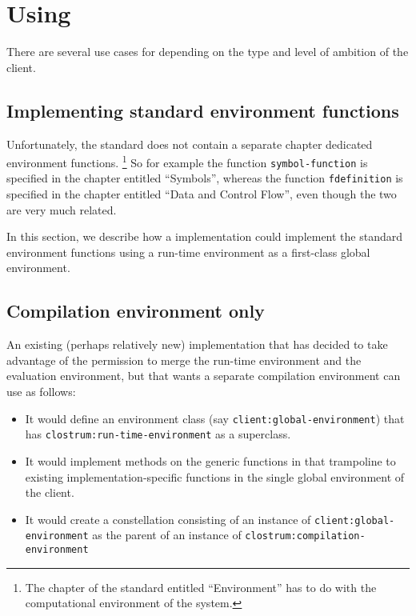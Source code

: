 \chapter{Using \sysname{}}

There are several use cases for \sysname{} depending on the type and
level of ambition of the client.

\section{Implementing standard environment functions}

Unfortunately, the \commonlisp{} standard does not contain a separate
chapter dedicated environment functions.%
\footnote{The chapter of the standard
  entitled ``Environment'' has to do with the computational environment
  of the \commonlisp{} system.}
So for example the function \texttt{symbol-function} is specified in
the chapter entitled ``Symbols'', whereas the function
\texttt{fdefinition} is specified in the chapter entitled ``Data and
Control Flow'', even though the two are very much related.

In this section, we describe how a \commonlisp{} implementation could
implement the standard environment functions using a \sysname{}
run-time environment as a first-class global environment.

\section{Compilation environment only}

An existing (perhaps relatively new) \commonlisp{} implementation that
has decided to take advantage of the permission to merge the run-time
environment and the evaluation environment, but that wants a separate
compilation environment can use \sysname{} as follows:

\begin{itemize}
\item It would define an environment class  (say
  \texttt{client:global-environment}) that has
  \texttt{clostrum:run-time-environment} as a superclass.
\item It would implement methods on the generic functions in
   that trampoline to existing
  implementation-specific functions in the single global environment
  of the client.
\item It would create a constellation consisting of an instance of
  \texttt{client:global-environment} as the parent of an instance of
  \texttt{clostrum:compilation-environment}
\end{itemize}

